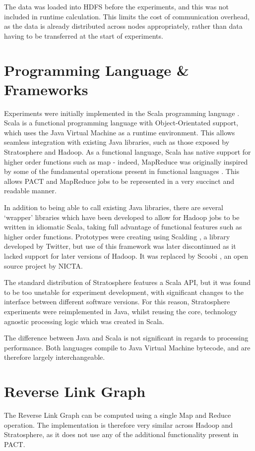 The data was loaded into HDFS before the experiments, and this was not included in runtime calculation. This limits the cost of communication overhead, as the data is already distributed across nodes appropriately, rather than data having to be transferred at the start of experiments. 

\section{Programming Language \& Frameworks}
Experiments were initially implemented in the Scala programming language \cite{scalalang}. Scala is a functional programming language with Object-Orientated support, which uses the Java Virtual Machine as a runtime environment. This allows seamless integration with existing Java libraries, such as those exposed by Stratosphere and Hadoop. As a functional language, Scala has native support for higher order functions such as map - indeed, MapReduce was originally inspired by some of the fundamental operations present in functional languages \cite{dean2008mapreduce}. This allows PACT and MapReduce jobs to be represented in a very succinct and readable manner. 

In addition to being able to call existing Java libraries, there are several `wrapper' libraries which have been developed to allow for Hadoop jobs to be written in idiomatic Scala, taking full advantage of functional features such as higher order functions. Prototypes were creating using Scalding \cite{scalding}, a library developed by Twitter, but use of this framework was later discontinued as it lacked support for later versions of Hadoop. It was replaced by Scoobi \cite{scoobi}, an open source project by NICTA.

The standard distribution of Stratosphere features a Scala API, but it was found to be too unstable for experiment development, with significant changes to the interface between different software versions. For this reason, Stratosphere experiments were reimplemented in Java, whilst reusing the core, technology agnostic processing logic which was created in Scala. 

The difference between Java and Scala is not significant in regards to processing performance. Both languages compile to Java Virtual Machine bytecode, and are therefore largely interchangeable. 
\section{Reverse Link Graph}
The Reverse Link Graph can be computed using a single Map and Reduce operation. The implementation is therefore very similar across Hadoop and Stratosphere, as it does not use any of the additional functionality present in PACT.

